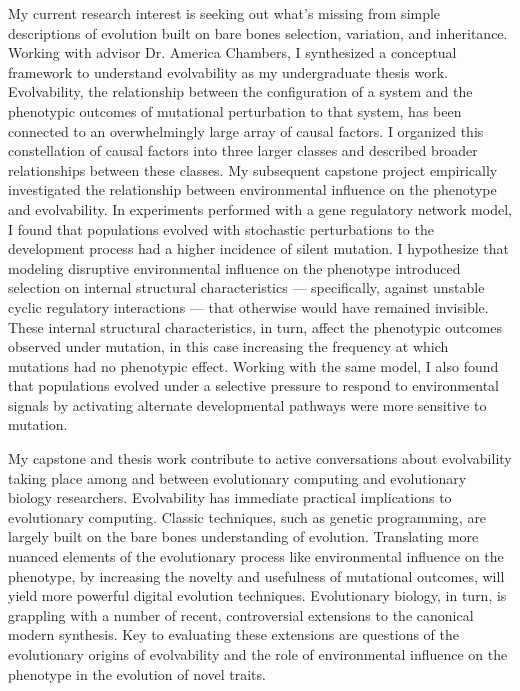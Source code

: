My current research interest is seeking out what's missing from simple descriptions of evolution built on bare bones selection, variation, and inheritance.
Working with advisor Dr. America Chambers, I synthesized a conceptual framework to understand evolvability as my undergraduate thesis work.
Evolvability, the relationship between the configuration of a system and the phenotypic outcomes of mutational perturbation to that system, has been connected to an overwhelmingly large array of causal factors.
I organized this constellation of causal factors into three larger classes and described broader relationships between these classes.
My subsequent capstone project empirically investigated the relationship between environmental influence on the phenotype and evolvability.
In experiments performed with a gene regulatory network model, I found that populations evolved with stochastic perturbations to the development process had a higher incidence of silent mutation.
I hypothesize that modeling disruptive environmental influence on the phenotype introduced selection on internal structural characteristics --- specifically, against unstable cyclic regulatory interactions --- that otherwise would have remained invisible.
These internal structural characteristics, in turn, affect the phenotypic outcomes observed under mutation, in this case increasing the frequency at which mutations had no phenotypic effect.
Working with the same model, I also found that populations evolved under a selective pressure to respond to environmental signals by activating alternate developmental pathways were more sensitive to mutation.

My capstone and thesis work contribute to active conversations about evolvability taking place among and between evolutionary computing and evolutionary biology researchers.
Evolvability has immediate practical implications to evolutionary computing.
Classic techniques, such as genetic programming, are largely built on the bare bones understanding of evolution.
Translating more nuanced elements of the evolutionary process like environmental influence on the phenotype, by increasing the novelty and usefulness of mutational outcomes, will yield more powerful digital evolution techniques.
Evolutionary biology, in turn, is grappling with a number of recent, controversial extensions to the canonical modern synthesis.
Key to evaluating these extensions are questions of the evolutionary origins of evolvability and the role of environmental influence on the phenotype in the evolution of novel traits.

